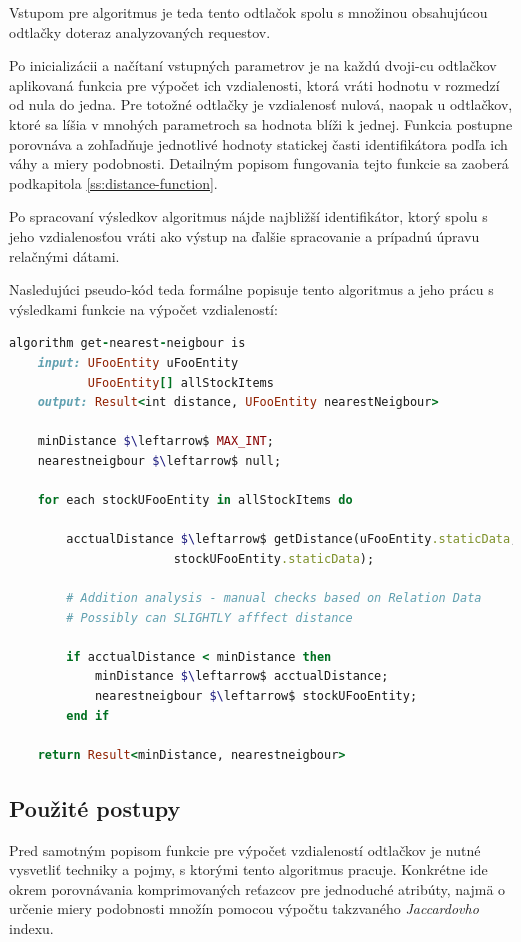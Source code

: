 \documentclass[
  digital, %
  table,   %
  lof,     %
  nolot,   %
  nocover
]{fithesis3}
\begin{document}
Vstupom pre algoritmus je teda tento odtlačok
spolu s množinou obsahujúcou odtlačky doteraz analyzovaných requestov.

Po
inicializácii a načítaní vstupných parametrov je na každú dvoji-cu odtlačkov
aplikovaná funkcia pre výpočet ich vzdialenosti, ktorá vráti hodnotu v rozmedzí
od nula do jedna. Pre totožné odtlačky je vzdialenosť nulová, naopak u
odtlačkov, ktoré sa líšia v mnohých parametroch sa hodnota blíži k jednej.
Funkcia postupne porovnáva a zohľadňuje jednotlivé hodnoty statickej časti
identifikátora podľa ich váhy a miery podobnosti. Detailným popisom fungovania
tejto funkcie sa zaoberá podkapitola \ref{ss:distance-function}. 

Po spracovaní
výsledkov algoritmus nájde najbližší identifikátor, ktorý spolu s jeho
vzdialenosťou vráti ako výstup na ďalšie spracovanie a prípadnú úpravu
relačnými dátami.

Nasledujúci pseudo-kód teda formálne popisuje tento algoritmus a jeho prácu s
výsledkami funkcie na výpočet vzdialeností:
\begin{lstlisting}[basicstyle=\footnotesize, language=Ruby, mathescape]
algorithm get-nearest-neigbour is
    input: UFooEntity uFooEntity
           UFooEntity[] allStockItems
    output: Result<int distance, UFooEntity nearestNeigbour>

    minDistance $\leftarrow$ MAX_INT;
    nearestneigbour $\leftarrow$ null;

    for each stockUFooEntity in allStockItems do

        acctualDistance $\leftarrow$ getDistance(uFooEntity.staticData,
                       stockUFooEntity.staticData);

        # Addition analysis - manual checks based on Relation Data
        # Possibly can SLIGHTLY afffect distance 

        if acctualDistance < minDistance then
            minDistance $\leftarrow$ acctualDistance;
            nearestneigbour $\leftarrow$ stockUFooEntity;
        end if
    
    return Result<minDistance, nearestneigbour>
\end{lstlisting}

\subsection{Použité postupy}
Pred samotným popisom funkcie pre výpočet vzdialeností odtlačkov je nutné
vysvetliť techniky a pojmy, s ktorými tento algoritmus pracuje. Konkrétne ide
okrem porovnávania komprimovaných reťazcov pre jednoduché atribúty, najmä o 
určenie miery podobnosti množín pomocou výpočtu takzvaného
\textit{Jaccardovho} indexu.
\end{document}
